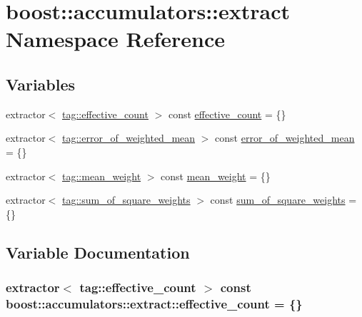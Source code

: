 \hypertarget{namespaceboost_1_1accumulators_1_1extract}{}\section{boost\+:\+:accumulators\+:\+:extract Namespace Reference}
\label{namespaceboost_1_1accumulators_1_1extract}
\subsection*{Variables}
\begin{DoxyCompactItemize}
\item 
extractor$<$ \hyperlink{structboost_1_1accumulators_1_1tag_1_1effective__count}{tag\+::effective\+\_\+count} $>$ const \hyperlink{namespaceboost_1_1accumulators_1_1extract_a3053aac83dc8752f96916fe5b8d4ce31}{effective\+\_\+count} = \{\}
\item 
extractor$<$ \hyperlink{structboost_1_1accumulators_1_1tag_1_1error__of__weighted__mean}{tag\+::error\+\_\+of\+\_\+weighted\+\_\+mean} $>$ const \hyperlink{namespaceboost_1_1accumulators_1_1extract_aa736c1893587667ab411a7d91493e2a5}{error\+\_\+of\+\_\+weighted\+\_\+mean} = \{\}
\item 
extractor$<$ \hyperlink{structboost_1_1accumulators_1_1tag_1_1mean__weight}{tag\+::mean\+\_\+weight} $>$ const \hyperlink{namespaceboost_1_1accumulators_1_1extract_aece73c78440e8b94bdcb26286cf53d99}{mean\+\_\+weight} = \{\}
\item 
extractor$<$ \hyperlink{structboost_1_1accumulators_1_1tag_1_1sum__of__square__weights}{tag\+::sum\+\_\+of\+\_\+square\+\_\+weights} $>$ const \hyperlink{namespaceboost_1_1accumulators_1_1extract_a3dfd926200a900b5e56b582630bca0a4}{sum\+\_\+of\+\_\+square\+\_\+weights} = \{\}
\end{DoxyCompactItemize}


\subsection{Variable Documentation}
\hypertarget{namespaceboost_1_1accumulators_1_1extract_a3053aac83dc8752f96916fe5b8d4ce31}{}
\subsubsection[{effective\+\_\+count}]{\setlength{\rightskip}{0pt plus 5cm}extractor$<$ {\bf tag\+::effective\+\_\+count} $>$ const boost\+::accumulators\+::extract\+::effective\+\_\+count = \{\}}\label{namespaceboost_1_1accumulators_1_1extract_a3053aac83dc8752f96916fe5b8d4ce31}
\hypertarget{namespaceboost_1_1accumulators_1_1extract_aa736c1893587667ab411a7d91493e2a5}{}
